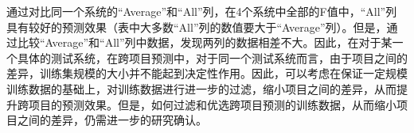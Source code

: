 通过对比同一个系统的“Average”和“All”列，在4个系统中全部的F值中，“All”列具有较好的预测效果（表中大多数“All”列的数值要大于“Average”列）。但是，通过比较“Average”和“All”列中数据，发现两列的数据相差不大。因此，在对于某一个具体的测试系统，在跨项目预测中，对于同一个测试系统而言，由于项目之间的差异，训练集规模的大小并不能起到决定性作用。因此，可以考虑在保证一定规模训练数据的基础上，对训练数据进行进一步的过滤，缩小项目之间的差异，从而提升跨项目的预测效果。但是，如何过滤和优选跨项目预测的训练数据，从而缩小项目之间的差异，仍需进一步的研究确认。

